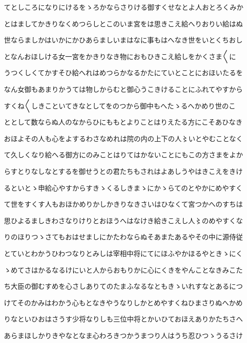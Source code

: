 \documentclass[a4paper,11pt,landscape]{ltjtarticle}
\begin{document}
てとしころになりにけるをゝろかならさりける御すくせなとよ人おとろくみか
\par\medskip
とはましてかきりなくめつらしとこのいま宮をは思きこえ給へりおりい給はぬ
\par\medskip
世ならましかはいかにかひあらましいまはなに事もはへなき世をいとくちおし
\par\medskip
となんおほしける女一宮をかきりなき物におもひきこえ給しをかくさま〱に
\par\medskip
うつくしくてかすそひ給へれはめつらかなるかたにていとことにおほいたるを
\par\medskip
なん女御もあまりかうては物しからむと御心うこきけることにふれてやすから
\par\medskip
すくね〱しきこといてきなとしてをのつから御中もへたゝるへかめり世のこ
\par\medskip
ととして数ならぬ人のなからひにももとよりことはりえたる方にこそあひなき
\par\medskip
おほよその人も心をよするわさなめれは院の内の上下の人〻いとやむことなく
\par\medskip
て久しくなり給へる御方にのみことはりてはかないことにもこの方さまをよか
\par\medskip
らすとりなしなとするを御せうとの君たちもされはよあしうやはきこえをきけ
\par\medskip
るといとゝ申給心やすからすきゝくるしきまゝにかゝらてのとやかにめやすく
\par\medskip
て世をすくす人もおほかめりかしかきりなきさいはひなくて宮つかへのすちは
\par\medskip
思ひよるましきわさなりけりとおほうへはなけき給きこえし人〻のめやすくな
\par\medskip
りのほりつゝさてもおはせましにかたわならぬそあまたあるやその中に源侍従
\par\medskip
とていとわかうひわつなりとみしは宰相中将にてにほふやかほるやときゝにく
\par\medskip
ゝめてさはかるなるけにいと人からおもりかに心にくきをやんことなきみこた
\par\medskip
ち大臣の御むすめを心さしありてのたまふなるなともきゝいれすなとあるにつ
\par\medskip
けてそのかみはわかう心もとなきやうなりしかとめやすくねひまさりぬへかめ
\par\medskip
りなといひおはさうす少将なりしも三位中将とかいひておほえありかたちさへ
\par\medskip
あらまほしかりきやなとなま心わろきつかうまつり人はうち忍ひつゝうるさけ
\par\medskip
\end{document}
